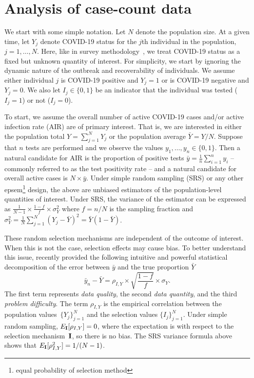 \documentclass[11pt]{amsart}
\numberwithin{equation}{section}
\theoremstyle{plain}
\def\I{\bf I}
\begin{document}

 \section{Analysis of case-count data}
 \label{section:casecount}

 We start with some simple notation.  Let $N$ denote the population size.  At a given time, let $Y_j$ denote COVID-19 status for the $j$th individual in the population, $j=1,\ldots, N$. Here, like in survey methodology~\citep{Cochran77}, we treat COVID-19 status as a fixed but unknown quantity of interest. For simplicity, we start by ignoring the dynamic nature of the outbreak and recoverability of individuals. We assume either individual $j$ is COVID-19 positive and $Y_j=1$ or is COVID-19 negative and $Y_j=0$. We also let $I_j \in \{0,1\}$ be an indicator that the individual was tested ($I_j = 1$) or not ($I_j=0$).

 To start, we assume the overall number of active COVID-19 cases and/or active infection rate (AIR) are of primary interest. That is, we are interested in either the population total $Y = \sum_{j=1}^N Y_j$ or the population average $\bar Y = Y/N$. Suppose that $n$ tests are performed and we observe the values $y_1, \ldots, y_n \in \{0,1\}$.  Then a natural candidate for AIR is the proportion of positive tests $\bar y = \frac{1}{n} \sum_{i=1}^n y_i$ -- commonly referred to as the test positivity rate -- and a natural candidate for overall active cases is $N \times \bar y$.
 Under simple random sampling (SRS) or any other epsem\footnote{equal probability of selection method} design, the above are unbiased estimators of the population-level quantities of interest.  Under SRS, the variance of the estimator can be expressed as $\frac{1}{N-1} \times \frac{1-f}{f} \times \sigma_Y^2$ where $f = n/N$ is the sampling fraction and $\sigma_Y^2 = \frac{1}{N} \sum_{j=1}^N (Y_j - \bar Y)^2 = \bar Y (1- \bar Y)$.

 These random selection mechanisms are independent of the outcome of interest. When this is not the case, selection effects may cause bias. To better understand this issue, \cite{Meng2018} recently provided the following intuitive and powerful statistical decomposition of the error between $\bar y$ and the true proportion $\bar Y$
 $$
 \bar y_n - \bar Y =  \rho_{I, Y} \times \sqrt{\frac{1-f}{f}} \times \sigma_Y.
 $$
 The first term represents \emph{data quality}, the second \emph{data quantity}, and the third \emph{problem difficulty}. The term $\rho_{I,Y}$ is the empirical correlation between the population values~$\{ Y_j \}_{j=1}^N$ and the selection values $\{ I_j \}_{j=1}^N$.  Under simple random sampling, $E_{\I} [ \rho_{I,Y} ] = 0$, where the expectation is with respect to the selection mechanism~$\I$, so there is no bias.  The SRS variance formula above shows that $E_{\I} [ \rho_{I,Y}^2 ]  = 1/(N-1)$.
\end{document}
